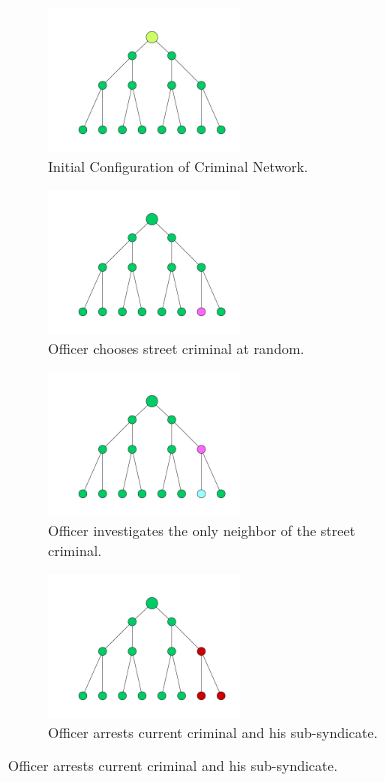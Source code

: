 \documentclass[11pt]{article}
\begin{document}
\begin{figure}\centering
 \begin{subfigure}[t]{0.3\textwidth}\centering
\includegraphics[width = 2in]{0.pdf}
\caption{Initial Configuration of Criminal Network.}\end{subfigure}
\quad
 \begin{subfigure}[t]{0.3\textwidth}\centering
\includegraphics[width = 2in]{1.pdf}
\caption{Officer chooses street criminal at random.}\end{subfigure}
\quad
 \begin{subfigure}[t]{0.3\textwidth}\centering
\includegraphics[width = 2in]{2.pdf}
\caption{Officer investigates the only neighbor of the street criminal.}\end{subfigure}
 \begin{subfigure}[t]{0.3\textwidth}\centering
\includegraphics[width = 2in]{3.pdf}
\caption{Officer arrests current criminal and his sub-syndicate.}\end{subfigure}

\end{figure}
\end{document}
